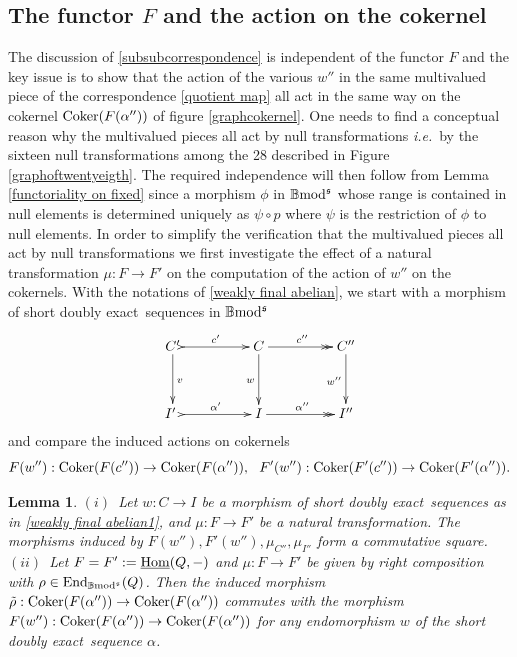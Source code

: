 \documentclass[12pt]{article}
\newtheorem{lem}[thm]{Lemma}
\def\End{{\rm End}}
\def\Homi{{\underline{\rm Hom}}}
\def\coker{{\rm Coker}}
\def\B{{\mathbb B}}
\def\exxx{{doubly exact}~}
\newcommand{\ie}{{\it i.e.\/}\ }
\def\End{{\mbox{End}}}
\def\b2{{\rm \B mod^{\mathfrak s}}}
\begin{document}
\subsection{The functor $F$ and the action on the cokernel}\label{subsecfunctact}
The  discussion of \ref{subsubcorrespondence} is independent of the functor $F$ and the key issue is to show that the action of the various $w''$ in the same multivalued piece of the correspondence \eqref{quotient map} all act in the same way on the cokernel $\coker(F(\alpha''))$ of figure \ref{graphcokernel}. One needs to find a conceptual reason why the multivalued pieces all act by null transformations \ie by the sixteen null transformations among the 28 described in Figure \ref{graphoftwentyeigth}. The required independence will then follow from Lemma \ref{functoriality on fixed}
since a morphism $\phi$ in $\b2$ whose range is contained in null elements is determined uniquely as $\psi \circ p$  where $\psi$ is the restriction of $\phi$ to null elements.
In order to simplify the verification that the multivalued pieces all act by null transformations we first investigate the effect of a natural transformation $\mu:F\to F'$ on the computation of the action of $w''$ on the cokernels. With the notations of \eqref{weakly final abelian}, we start with a morphism of short \exxx sequences in $\b2$
\begin{equation}\label{weakly final abelian1}
\xymatrix@C=20pt@R=35pt{
  C'\ar[d]^{v}\ar@{>->}[rr]^{c'} && C \ar[d]_{w} \ar@{->>}[rr]^{c''}&& C''\ar[d]_{w''}
\\
I' \ \ar@{>->}[rr]^{\alpha'}&& I \ar@{->>}[rr]^{\alpha''}&& I''}
\end{equation}
and compare the induced actions on cokernels 
\begin{equation}\label{right action}
F(w''): \coker(F(c''))\to \coker(F(\alpha'')),\ \ F'(w''): \coker(F'(c''))\to \coker(F'(\alpha'')).	
\end{equation}
 \begin{lem}\label{naturality}
$(i)$~Let $w:C\to I$ be a morphism of short \exxx sequences as in \eqref{weakly final abelian1}, and $\mu:F\to F'$ be a natural transformation. The  morphisms induced by 
$F(w''), F'(w''), \mu_{C''}, \mu_{I''}$ form a commutative square.\newline
 $(ii)$~Let $F=F':=\Homi(Q,-)$ and $\mu:F\to F'$ be given by right composition with $\rho\in \End_\b2(Q)$. Then the induced morphism $\tilde \rho:\coker(F(\alpha''))\to \coker(F(\alpha''))$ commutes with the morphism $F(w''): \coker(F(\alpha''))\to \coker(F(\alpha''))$
 for any endomorphism $w$ of the short \exxx sequence $\alpha$.
\end{lem}
\end{document}

